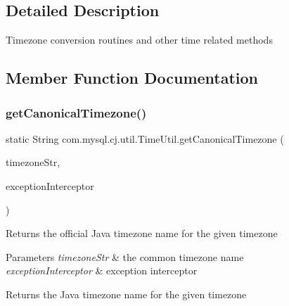 \subsection{Detailed Description}
Timezone conversion routines and other time related methods 

\subsection{Member Function Documentation}
\mbox{\label{classcom_1_1mysql_1_1cj_1_1util_1_1_time_util_a1b38bb130406d82a66ace616a2966b74}} 
\subsubsection{\texorpdfstring{get\+Canonical\+Timezone()}{getCanonicalTimezone()}}
{\footnotesize\ttfamily static String com.\+mysql.\+cj.\+util.\+Time\+Util.\+get\+Canonical\+Timezone (\begin{DoxyParamCaption}\item[{String}]{timezone\+Str,  }\item[{\mbox{\hyperlink{interfacecom_1_1mysql_1_1cj_1_1exceptions_1_1_exception_interceptor}{Exception\+Interceptor}}}]{exception\+Interceptor }\end{DoxyParamCaption})\hspace{0.3cm}{\ttfamily [static]}}

Returns the \textquotesingle{}official\textquotesingle{} Java timezone name for the given timezone


\begin{DoxyParams}{Parameters}
{\em timezone\+Str} & the \textquotesingle{}common\textquotesingle{} timezone name \\
\hline
{\em exception\+Interceptor} & exception interceptor\\
\hline
\end{DoxyParams}
\begin{DoxyReturn}{Returns}
the Java timezone name for the given timezone 
\end{DoxyReturn}
\mbox{\label{classcom_1_1mysql_1_1cj_1_1util_1_1_time_util_a1da7f3d2dfbeaf21b375380c2d90b36a}} 
